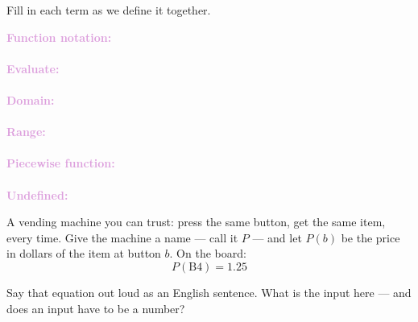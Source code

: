 \documentclass[10pt]{article}
\begin{document}

\vspace{0.12in}

\boxguard
\begin{vocabbox}
Fill in each term as we define it together.
\par\vspace{2pt}
\noindent\textbf{\textcolor{plum}{Function notation:}}\\[1pt]
\writeline\\[3pt]
\noindent\textbf{\textcolor{plum}{Evaluate:}}\\[1pt]
\writeline\\[3pt]
\noindent\textbf{\textcolor{plum}{Domain:}}\\[1pt]
\writeline\\[3pt]
\noindent\textbf{\textcolor{plum}{Range:}}\\[1pt]
\writeline\\[3pt]
\noindent\textbf{\textcolor{plum}{Piecewise function:}}\\[1pt]
\writeline\\[3pt]
\noindent\textbf{\textcolor{plum}{Undefined:}}\\[1pt]
\writeline
\end{vocabbox}

\vspace{0.1in}

\boxguard
\begin{hookbox}
A vending machine you can trust: press the same button, get the same item, every
time. Give the machine a name --- call it $P$ --- and let $P(b)$ be the price in
dollars of the item at button $b$. On the board:
\[ P(\text{B4}) = 1.25 \]

Say that equation out loud as an English sentence. What is the input here ---
and does an input have to be a number?
\end{hookbox}
\end{document}
